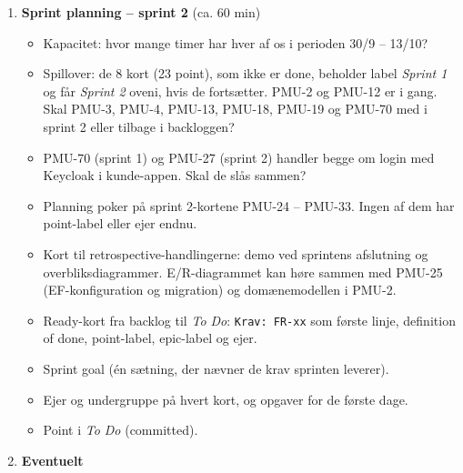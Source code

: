 \documentclass[a4paper,11pt]{article}
\begin{document}
\begin{enumerate}
\begin{itemize}
        \item \textbf{Hvad gik skidt?} Man har ikke overblik over, hvad den anden undergruppe har lavet, før vi holder en demo, og den kan vi ikke holde endnu.
        \item \textbf{Hvad ændrer vi i sprint 2?}
        \begin{itemize}
            \item Hver sprint slutter med en demo, så alle også kender de dele, de ikke selv har arbejdet på.
            \item Et lille sæt overbliksdiagrammer (fx et E/R-diagram), som man kan slå op i for at forstå projektet. Kun diagrammer, der bliver brugt -- ingen ligegyldige diagrammer.
            \item Hver handling bliver et kort i Kaneo.
        \end{itemize}
        \item Skal definition of done justeres?
    \end{itemize}
    \item \textbf{Sprint planning -- sprint 2} (ca. 60 min)
    \begin{itemize}
        \item Kapacitet: hvor mange timer har hver af os i perioden 30/9 -- 13/10?
        \item Spillover: de 8 kort (23 point), som ikke er done, beholder label \emph{Sprint 1} og får \emph{Sprint 2} oveni, hvis de fortsætter. PMU-2 og PMU-12 er i gang. Skal PMU-3, PMU-4, PMU-13, PMU-18, PMU-19 og PMU-70 med i sprint 2 eller tilbage i backloggen?
        \item PMU-70 (sprint 1) og PMU-27 (sprint 2) handler begge om login med Keycloak i kunde-appen. Skal de slås sammen?
        \item Planning poker på sprint 2-kortene PMU-24 -- PMU-33. Ingen af dem har point-label eller ejer endnu.
        \item Kort til retrospective-handlingerne: demo ved sprintens afslutning og overbliksdiagrammer. E/R-diagrammet kan høre sammen med PMU-25 (EF-konfiguration og migration) og domænemodellen i PMU-2.
        \item Ready-kort fra backlog til \emph{To Do}: \texttt{Krav: FR-xx} som første linje, definition of done, point-label, epic-label og ejer.
        \item Sprint goal (én sætning, der nævner de krav sprinten leverer).
        \item Ejer og undergruppe på hvert kort, og opgaver for de første dage.
        \item Point i \emph{To Do} (committed).
    \end{itemize}
    \item \textbf{Eventuelt}
\end{enumerate}
\end{document}
